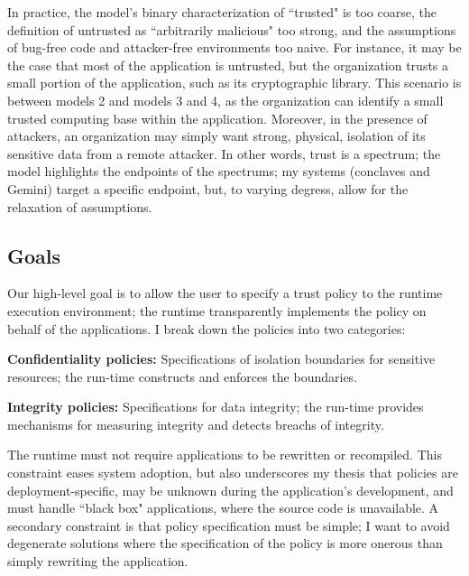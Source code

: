 In practice, the model's binary characterization of ``trusted" is too coarse,
the definition of untrusted as ``arbitrarily malicious" too strong,
and the assumptions of bug-free code and attacker-free environments too
naive.
%
For instance, it may be the case that most of the application is untrusted, but
the organization trusts a small portion of the application, such as its
cryptographic library.
%
This scenario is between models 2 and models 3 and 4, as the organization can
identify a small trusted computing base within the application.
%
Moreover, in the presence of attackers, an organization may simply
want strong, physical, isolation of its sensitive data from a remote attacker.
%
In other words, trust is a spectrum; the model highlights the endpoints of the
spectrums; my systems (conclaves and Gemini) target a specific endpoint, but,
to varying degress, allow for the relaxation of assumptions.



\subsection{Goals}

Our high-level goal is to allow the user to specify a trust policy to the
runtime execution environment; the runtime transparently implements the
policy on behalf of the applications.
%
I break down the policies into two categories:

\begin{widelist}
\item \textbf{Confidentiality policies:} Specifications of isolation boundaries for
    sensitive resources; the run-time constructs and enforces the boundaries.

\item \textbf{Integrity policies:} Specifications for data integrity; the run-time
    provides mechanisms for measuring integrity and detects breachs of
    integrity.
\end{widelist}


%
The runtime must not require applications to be rewritten or recompiled.
%
This constraint eases system adoption, but also underscores my
thesis that policies are deployment-specific, may be unknown during the
application's development, and must handle ``black box" applications, where the
source code is unavailable.
%
A secondary constraint is that policy specification  must be simple; I want to avoid
degenerate solutions where the specification of the policy is more
onerous than simply rewriting the application.


